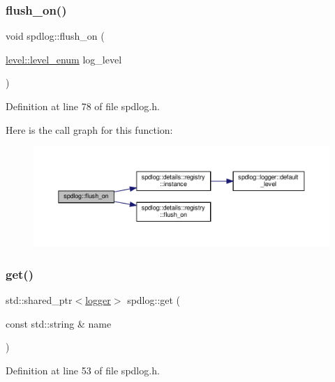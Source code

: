 \subsubsection{\texorpdfstring{flush\+\_\+on()}{flush\_on()}}
{\footnotesize\ttfamily void spdlog\+::flush\+\_\+on (\begin{DoxyParamCaption}\item[{\hyperlink{namespacespdlog_1_1level_a35f5227e5daf228d28a207b7b2aefc8b}{level\+::level\+\_\+enum}}]{log\+\_\+level }\end{DoxyParamCaption})\hspace{0.3cm}{\ttfamily [inline]}}



Definition at line 78 of file spdlog.\+h.

Here is the call graph for this function\+:
\nopagebreak
\begin{figure}[H]
\begin{center}
\leavevmode
\includegraphics[width=350pt]{namespacespdlog_afac55b239302064cba773add59b635d1_cgraph}
\end{center}
\end{figure}
\mbox{\label{namespacespdlog_a658d68d4ebdb11793b1e78582f108674}} 
\subsubsection{\texorpdfstring{get()}{get()}}
{\footnotesize\ttfamily std\+::shared\+\_\+ptr$<$\hyperlink{classspdlog_1_1logger}{logger}$>$ spdlog\+::get (\begin{DoxyParamCaption}\item[{const std\+::string \&}]{name }\end{DoxyParamCaption})\hspace{0.3cm}{\ttfamily [inline]}}



Definition at line 53 of file spdlog.\+h.


